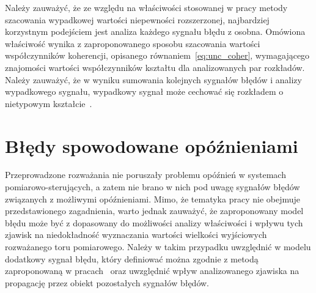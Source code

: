 Należy zauważyć, że ze względu na właściwości stosowanej w pracy metody szacowania wypadkowej wartości niepewności rozszerzonej, najbardziej korzystnym podejściem jest analiza każdego sygnału błędu z osobna. Omówiona właściwość wynika z zaproponowanego sposobu szacowania wartości współczynników koherencji, opisanego równaniem~\eqref{eq:unc_coher}, wymagającego znajomości wartości współczynników kształtu dla analizowanych par rozkładów. Należy zauważyć, że w wyniku sumowania kolejnych sygnałów błędów i analizy wypadkowego sygnału, wypadkowy sygnał może cechować się rozkładem o nietypowym kształcie~\cite{auth_electronics, zhang_pdp}.

\section{Błędy spowodowane opóźnieniami}

Przeprowadzone rozważania nie poruszały problemu opóźnień w systemach pomiarowo-sterujących, a zatem nie brano w nich pod uwagę sygnałów błędów związanych z możliwymi opóźnieniami. Mimo, że tematyka pracy nie obejmuje przedstawionego zagadnienia, warto jednak zauważyć, że zaproponowany model błędu może być z dopasowany do możliwości analizy właściwości i wpływu tych zjawisk na niedokładność wyznaczania wartości wielkości wyjściowych rozważanego toru pomiarowego. Należy w takim przypadku uwzględnić w modelu dodatkowy sygnał błędu, który definiować można zgodnie z metodą zaproponowaną w pracach~\cite{wymyslo_delay, jakubiec_system} oraz uwzględnić wpływ analizowanego zjawiska na propagację przez obiekt pozostałych sygnałów błędów.

